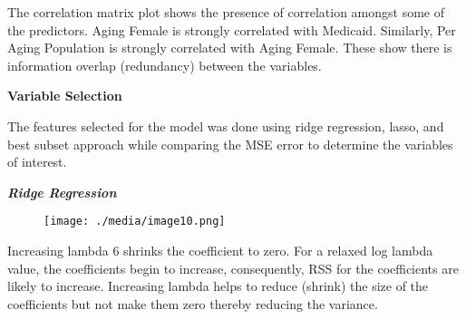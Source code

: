 \documentclass[12pt]{article}
\begin{document}
\vspace{\baselineskip}
\begin{justify}
The correlation matrix plot shows the presence of correlation amongst some of the predictors. Aging Female is strongly correlated with Medicaid. Similarly, Per Aging Population is strongly correlated with Aging Female. These show there is information overlap (redundancy) between the variables.
\end{justify}\par

\begin{Center}
\textbf{Variable Selection}
\end{Center}\par


\vspace{\baselineskip}
\textbf{ }The features selected for the model was done using ridge regression, lasso, and best subset approach while comparing the MSE error to determine the variables of interest.\par


\vspace{\baselineskip}

\vspace{\baselineskip}

\vspace{\baselineskip}

\vspace{\baselineskip}

\vspace{\baselineskip}

\vspace{\baselineskip}

\vspace{\baselineskip}
\textbf{\textit{Ridge Regression}}\par




\begin{figure}[H]
	\begin{Center}
		\texttt{[image: ./media/image10.png]}
	\end{Center}
\end{figure}



\par

Increasing lambda 6 shrinks the coefficient to zero. For a relaxed log lambda value, the coefficients begin to increase, consequently, RSS for the coefficients are likely to increase. Increasing lambda helps to reduce (shrink) the size of the coefficients but not make them zero thereby reducing the variance.\par
\end{document}
